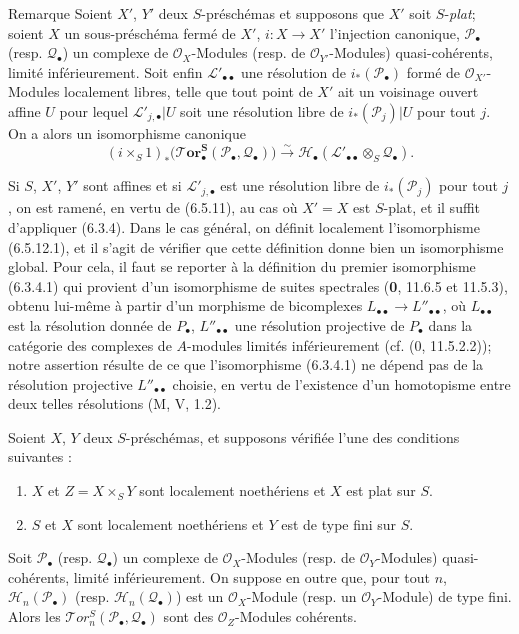 \begin{namedtheorem}[6.5.12]{Remarque}
Soient $X'$, $Y'$ deux $S$-préschémas et supposons que $X'$ soit $S$-\emph{plat};
soient $X$ un sous-préschéma fermé de $X'$, $i:X\to X'$ l'injection canonique,
$\mathscr P_\bullet$ (resp. $\mathscr Q_\bullet$) un complexe de
$\mathscr O_X$-Modules (resp. de $\mathscr O_{Y'}$-Modules) quasi-cohérents,
limité inférieurement. Soit enfin $\mathscr L'_{\bullet\bullet}$ une résolution
de $i_*(\mathscr P_\bullet)$ formé de $\mathscr O_{X'}$-Modules localement
libres, telle que tout point de $X'$ ait un voisinage ouvert affine $U$ pour
lequel $\mathscr L'_{j,\bullet}|U$ soit une résolution libre de
$i_*(\mathscr P_j)|U$ pour tout $j$. On a alors un isomorphisme canonique
\[
  (i\times_S 1)_*
  \bigl(\boldsymbol{\mathscr{T}\!or}_\bullet^{\mathbf S}
    (\mathscr P_\bullet,\mathscr Q_\bullet)\bigr)
  \xrightarrow{\sim}
  \mathscr H_\bullet
  (\mathscr L'_{\bullet\bullet}\otimes_S\mathscr Q_\bullet).
  \tag{6.5.12.1}\label{III.6.5.12.1.fr}
\]

Si $S$, $X'$, $Y'$ sont affines et si $\mathscr L'_{j,\bullet}$ est une
résolution libre de $i_*(\mathscr P_j)$ pour tout $j$, on est ramené, en vertu
de (6.5.11), au cas où $X'=X$ est $S$-plat, et il suffit d'appliquer (6.3.4).
Dans le cas général, on définit localement l'isomorphisme (6.5.12.1), et il
s'agit de vérifier que cette définition donne bien un isomorphisme global.
Pour cela, il faut se reporter à la définition du premier isomorphisme
(6.3.4.1) qui provient d'un isomorphisme de suites spectrales (\textbf{0}, 11.6.5 et
11.5.3), obtenu lui-même à partir d'un morphisme de bicomplexes
$L_{\bullet\bullet}\to L''_{\bullet\bullet}$, où $L_{\bullet\bullet}$ est la
résolution donnée de $P_\bullet$, $L''_{\bullet\bullet}$ une résolution
projective de $P_\bullet$ dans la catégorie des complexes de $A$-modules
limités
inférieurement (cf. (0, 11.5.2.2)); notre assertion résulte de ce que
l'isomorphisme (6.3.4.1) ne dépend pas de la résolution projective
$L''_{\bullet\bullet}$ choisie, en vertu de l'existence d'un homotopisme entre
deux telles résolutions (M, V, 1.2).
\end{namedtheorem}

\begin{proposition}[6.5.13]
Soient $X$, $Y$ deux $S$-préschémas, et supposons vérifiée l'une des conditions
suivantes :
\begin{enumerate}
  \item[(i)] $X$ et $Z=X\times_S Y$ sont localement noethériens et $X$ est plat
    sur $S$.
  \item[(ii)] $S$ et $X$ sont localement noethériens et $Y$ est de type fini
    sur $S$.
\end{enumerate}
Soit $\mathscr P_\bullet$ (resp. $\mathscr Q_\bullet$) un complexe de
$\mathscr O_X$-Modules (resp. de $\mathscr O_Y$-Modules) quasi-cohérents,
limité inférieurement. On suppose en outre que, pour tout $n$,
$\mathscr H_n(\mathscr P_\bullet)$ (resp.
$\mathscr H_n(\mathscr Q_\bullet)$) est un $\mathscr O_X$-Module (resp. un
$\mathscr O_Y$-Module) de type fini. Alors les
$\mathscr{T}\!or_n^S(\mathscr P_\bullet,\mathscr Q_\bullet)$ sont des
$\mathscr O_Z$-Modules cohérents.
\end{proposition}

